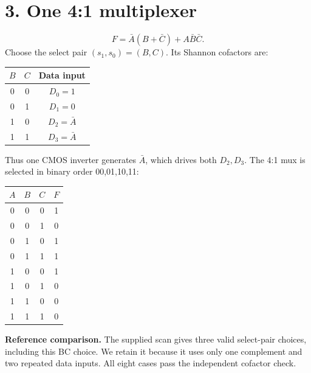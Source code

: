 \documentclass[11pt,a4paper]{article}
\begin{document}
\section*{3. One 4:1 multiplexer}
\[
 F=\bar A(B+\bar C)+A\bar B\bar C.
\]
Choose the select pair $(s_1,s_0)=(B,C)$. Its Shannon cofactors are:
\begin{center}\begin{tabular}{cc|c}\toprule
$B$&$C$&Data input\\\midrule
0&0&$D_0=1$\\0&1&$D_1=0$\\1&0&$D_2=\bar A$\\1&1&$D_3=\bar A$\\\bottomrule
\end{tabular}\end{center}
Thus one CMOS inverter generates $\bar A$, which drives both $D_2,D_3$. The 4:1 mux is selected in binary order 00,01,10,11:
\begin{center}\end{center}
\begin{center}\begin{tabular}{ccc|c}\toprule
$A$&$B$&$C$&$F$\\\midrule
0&0&0&1\\0&0&1&0\\0&1&0&1\\0&1&1&1\\
1&0&0&1\\1&0&1&0\\1&1&0&0\\1&1&1&0\\\bottomrule
\end{tabular}\end{center}
\textbf{Reference comparison.} The supplied scan gives three valid select-pair choices, including this BC choice. We retain it because it uses only one complement and two repeated data inputs. All eight cases pass the independent cofactor check.

\newpage
\end{document}
